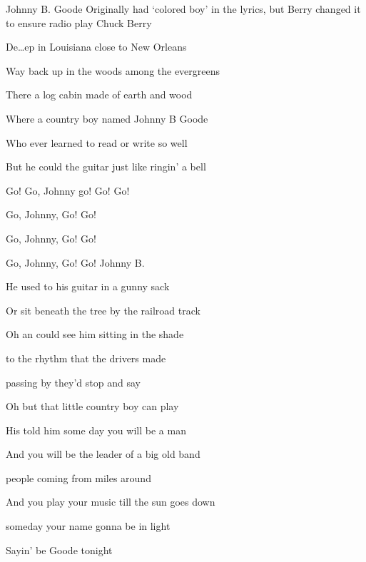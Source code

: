 \begin{SBSong}{Johnny B. Goode}
  {Originally had `colored boy' in the lyrics, but Berry changed it to ensure radio play}
  {Chuck Berry}
  \begin{SBVerse}
    De\ldots ep  in Louisiana close to New Orleans
    
    Way back up in the woods among the evergreens
    
    There  a log cabin made of earth and wood
    
    Where  a country boy named Johnny B Goode
    
    Who  ever learned to read or write so well
    
    But he could  the guitar just like ringin' a bell
  \end{SBVerse}
  \begin{SBChorus}
     Go! Go, Johnny go! Go! Go!
    
    Go, Johnny, Go!  Go!
    
    Go, Johnny, Go!  Go!
    
    Go, Johnny, Go!  Go! Johnny B. 
  \end{SBChorus}
  \begin{SBVerse}
    He used to  his guitar in a gunny sack
    
    Or sit beneath the tree by the railroad track
    
    Oh an  could see him sitting in the shade
    
     to the rhythm that the drivers made
    
     passing by they'd stop and say
    
    Oh  but that little country boy can play
  \end{SBVerse}
  \begin{SBVerse}
    His  told him some day you will be a man
    
    And you will be the leader of a big old band
    
     people coming from miles around
    
    And  you play your music till the sun goes down
    
     someday your name gonna be in light
    
    Sayin'  be Goode tonight
  \end{SBVerse}
\end{SBSong}
